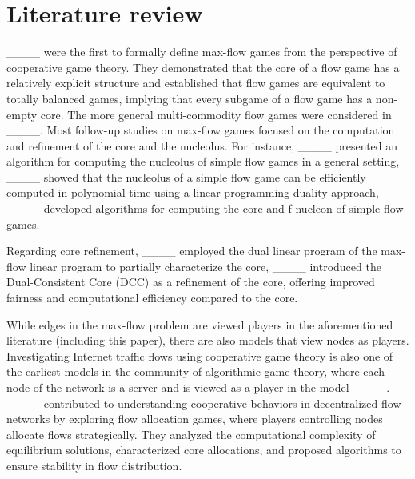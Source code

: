 \section{Literature review}
____ were the first to formally define max-flow games from the perspective of cooperative game theory. They demonstrated that the core of a flow game has a relatively explicit structure and established that flow games are equivalent to totally balanced games, implying that every subgame of a flow game has a non-empty core. The more general multi-commodity flow games were considered in ____.  Most follow-up studies on max-flow games  focused on the computation and refinement of the core and the nucleolus. For instance, ____ presented an algorithm for computing the nucleolus of simple flow games in a general setting, ____ showed that the nucleolus of a simple flow game can be efficiently computed in polynomial time using a linear programming duality approach, ____ developed algorithms for computing the core and f-nucleon of simple flow games.  

Regarding core refinement, ____ employed the dual linear program of the max-flow linear program to partially characterize the core,  ____ introduced the Dual-Consistent Core (DCC) as a refinement of the core,  offering improved fairness and computational efficiency compared to the core.

While edges in the max-flow problem are viewed  players in the aforementioned literature (including this paper), there are also models that view nodes as players.  Investigating Internet traffic flows using  cooperative game theory is also one of the earliest models in the community of algorithmic game theory, where each node of the network is a server and is viewed as a player  in the model ____. ____ contributed to understanding cooperative behaviors in decentralized flow networks by exploring flow allocation games, where players controlling nodes allocate flows strategically. They analyzed the computational complexity of equilibrium solutions, characterized core allocations, and proposed algorithms to ensure stability in flow distribution. 


